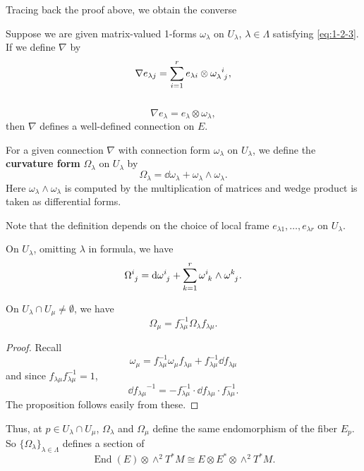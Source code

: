 \documentclass[12pt]{article}
\begin{document}
Tracing back the proof above, we obtain the converse
\begin{prop}
    Suppose we are given matrix-valued 1-forms \(\omega_\lambda\) on
    \(U_\lambda\), \(\lambda\in \Lambda\) satisfying \cref{eq:1-2-3}.
    If we define \(\nabla\) by \[
        \nabla e_{\lambda j}=\sum_{i=1}^{r} e_{\lambda i}\otimes 
        \tensor{\omega}{_\lambda^i_j}
    ,\] \ie\ \[
        \nabla e_\lambda=e_\lambda\otimes\omega_\lambda
    ,\] then \(\nabla\) defines a well-defined connection on \(E\).
\end{prop}

\begin{definition}
    For a given connection \(\nabla\) with connection form \(\omega
    _\lambda\) on \(U_\lambda\), we define the \textbf{curvature form}
    \(\Omega_\lambda\) on \(U_\lambda\) by \[
        \Omega_\lambda=\dd{\omega_\lambda}+\omega_\lambda\wedge
        \omega_\lambda
    .\] Here \(\omega_\lambda\wedge \omega_\lambda\) is computed by the
    multiplication of matrices and wedge product is taken as differential
    forms.
\end{definition}
Note that the definition depends on the choice of local frame
\(e_{\lambda 1},\ldots,e_{\lambda r}\) on \(U_\lambda\).

On \(U_\lambda\), omitting \(\lambda\) in formula, we have \[
    \tensor{\Omega}{^i_j}=\dd{\tensor{\omega}{^i_j}}
    +\sum_{k=1}^{r}\tensor{\omega}{^i_k}\wedge \tensor{\omega}{^k_j}
.\] 

\begin{prop}
    On \(U_\lambda\cap U_\mu\neq \emptyset\), we have \[
        \Omega_\mu=f_{\lambda\mu}^{-1}\Omega_{\lambda}f_{\lambda\mu}
    .\] 
\end{prop}
\begin{proof}
    Recall \[
        \omega_\mu=f_{\lambda\mu}^{-1}\omega_\mu f_{\lambda\mu}
        +f_{\lambda\mu}^{-1}\dd{f_{\lambda\mu}}
    \] and since \(f_{\lambda\mu}f_{\lambda\mu}^{-1}=1\), \[
        \dd{f_{\lambda\mu}}^{-1}=-f_{\lambda\mu}^{-1}\cdot
        \dd{f_{\lambda\mu}}\cdot f_{\lambda\mu}^{-1}
    .\] The proposition follows easily from these.
\end{proof}

Thus, at \(p\in U_\lambda\cap U_\mu\), \(\Omega_\lambda\) and
\(\Omega_\mu\) define the same endomorphism of the fiber \(E_p\).
So \(\{\Omega_\lambda\}_{\lambda\in \Lambda}\) defines a section of \[
    \operatorname{End}(E)\otimes \wedge^2T^*M\cong E\otimes E^*\otimes 
    \wedge^2T^*M
.\] 
\end{document}
